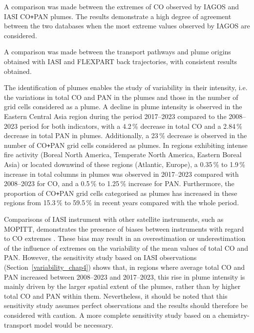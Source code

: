 \documentclass[acp, manuscript]{copernicus}
\begin{document}
A comparison was made between the extremes of CO observed by IAGOS and IASI CO\texttt{+}PAN plumes. The results demonstrate a high degree of agreement between the two databases when the most extreme values observed by IAGOS are considered. 


A comparison was made between the transport pathways and plume origins obtained with IASI and FLEXPART back trajectories, with consistent results obtained. 

The identification of plumes enables the study of variability in their intensity, i.e. the variations in total CO and PAN in the plumes and those in the number of grid cells considered as a plume. A decline in plume intensity is observed in the Eastern Central Asia region during the period 2017--2023 compared to the 2008--2023 period for both indicators, with a 4.2\,\% decrease in total CO and a 2.84\,\% decrease in total PAN in plumes. Additionally, a 23\,\% decrease is observed in the number of CO\texttt{+}PAN grid cells considered as plumes.
In regions exhibiting intense fire activity (Boreal North America, Temperate North America, Eastern Boreal Asia) or located downwind of these regions (Atlantic, Europe), a 0.35\,\% to 1.9\,\% increase in total columns in plumes was observed in 2017--2023 compared with 2008--2023 for CO, and a 0.5\,\% to 1.25\,\% increase for PAN. Furthermore, the proportion of CO\texttt{+}PAN grid cells categorised as plumes has increased in these regions from 15.3\,\% to 59.5\,\% in recent years compared with the whole period. 


Comparisons of IASI instrument with other satellite instruments, such as MOPITT, demonstrates the presence of biases between instruments with regard to CO extremes \citep{georgeExaminationLongtermCO2015}. These bias may result in an overestimation or underestimation of the influence of extremes on the variability of the mean values of total CO and PAN. 
However, the sensitivity study based on IASI observations (Section~\ref{variability_chap4}) shows that, in regions where average total CO and PAN increased between 2008--2023 and 2017--2023, this rise in plume intensity is mainly driven by the larger spatial extent of the plumes, rather than by higher total CO and PAN within them.
Nevertheless, it should be noted that this sensitivity study assumes perfect observations and the results should therefore be considered with caution. A more complete sensitivity study based on a chemistry-transport model would be necessary. 
\end{document}
